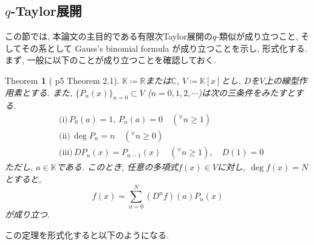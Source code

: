 \documentclass[11pt]{jsreport}
\theoremstyle{mystyle}
\newtheorem{thm}[df]{$\textrm{Theorem}$}
\newcommand{\bthm}{\begin{shadebox} \begin{thm}}
\newcommand{\ethm}{\end{thm} \end{shadebox}}
\newcommand{\bpf}{\begin{proof}}
\newcommand{\epf}{\end{proof}}
\newcommand{\R}{\mathbb{R}}
\newcommand{\C}{\mathbb{C}}
\newcommand{\K}{\mathbb{K}}
\newcommand{\0}{\textbf{0}}
\begin{document}
\subsection{$q$-Taylor展開} \label{ssec q_Taylor}
この節では, 本論文の主目的である有限次Taylor展開の$q$-類似が成り立つこと, そしてその系として Gauss's binomial formula が成り立つことを示し, 形式化する. 
まず, 一般に以下のことが成り立つことを確認しておく. 
\bthm[\cite{Kac} p5 Theorem 2.1] \label{general_Taylor}
$\K\coloneqq\R$または$\C$, $V\coloneqq\K[x]$とし, $D$を$V$上の線型作用素とする. また, 
$\{P_n(x)\}_{n=0}\subset V$ ($n=0,1,2,\cdots$)は次の三条件をみたすとする. 
  \begin{align*}
    &\textrm{(i)}\,P_0(a) = 1,\,P_n(a)=0 \quad ({}^{\forall}n\ge1)\\
    &\textrm{(ii)}\,\deg P_n = n \quad ({}^{\forall}n\ge0)\\
    &\textrm{(iii)}\,DP_n(x) = P_{n-1}(x) \quad ({}^{\forall}n\ge1), \quad D(1) = 0
  \end{align*}
ただし, $a\in\K$である. このとき, 任意の多項式$f(x)\in V$に対し, $\deg f(x)=N$とすると, 
  \[
    f(x) = \sum_{n=0}^N(D^nf)(a)P_n(x)
  \]
が成り立つ. 
\ethm
この定理を形式化すると以下のようになる. 
\end{document}
